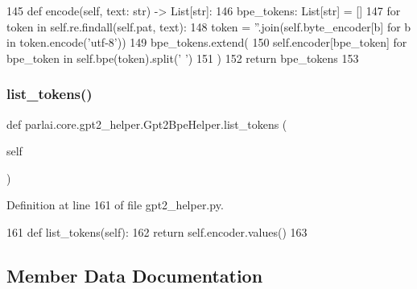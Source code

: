 \begin{DoxyCode}
145     \textcolor{keyword}{def }encode(self, text: str) -> List[str]:
146         bpe\_tokens: List[str] = []
147         \textcolor{keywordflow}{for} token \textcolor{keywordflow}{in} self.re.findall(self.pat, text):
148             token = \textcolor{stringliteral}{''}.join(self.byte\_encoder[b] \textcolor{keywordflow}{for} b \textcolor{keywordflow}{in} token.encode(\textcolor{stringliteral}{'utf-8'}))
149             bpe\_tokens.extend(
150                 self.encoder[bpe\_token] \textcolor{keywordflow}{for} bpe\_token \textcolor{keywordflow}{in} self.bpe(token).split(\textcolor{stringliteral}{' '})
151             )
152         \textcolor{keywordflow}{return} bpe\_tokens
153 
\end{DoxyCode}
\mbox{\label{classparlai_1_1core_1_1gpt2__helper_1_1Gpt2BpeHelper_a36f3a5cb4264010b4891605508147442}} 
\subsubsection{\texorpdfstring{list\+\_\+tokens()}{list\_tokens()}}
{\footnotesize\ttfamily def parlai.\+core.\+gpt2\+\_\+helper.\+Gpt2\+Bpe\+Helper.\+list\+\_\+tokens (\begin{DoxyParamCaption}\item[{}]{self }\end{DoxyParamCaption})}



Definition at line 161 of file gpt2\+\_\+helper.\+py.


\begin{DoxyCode}
161     \textcolor{keyword}{def }list\_tokens(self):
162         \textcolor{keywordflow}{return} self.encoder.values()
163 \end{DoxyCode}


\subsection{Member Data Documentation}
\mbox{\label{classparlai_1_1core_1_1gpt2__helper_1_1Gpt2BpeHelper_a3138a0a7614de78ee773642fbe6ddaae}} 
